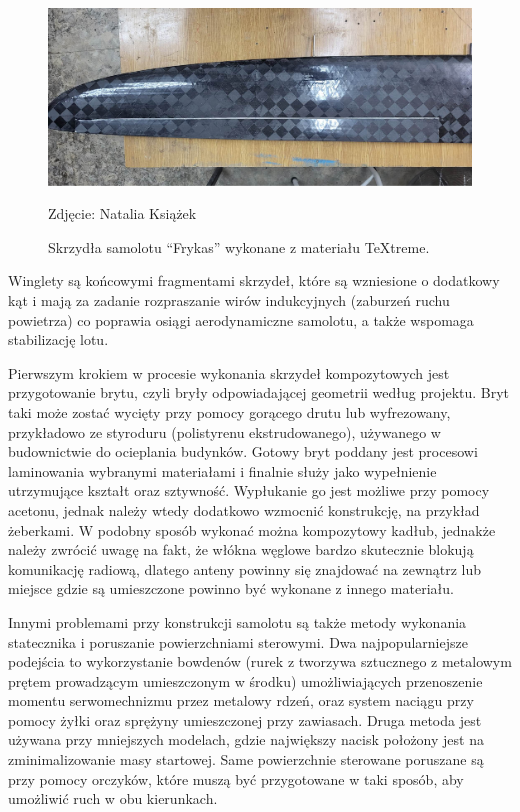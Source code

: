 \documentclass[12pt, a4paper]{article}
\begin{document}
 \begin{figure}[ht]
    \centering
    \includegraphics[width=1\textwidth]{frykas}
    \caption{Skrzydła samolotu ``Frykas'' wykonane z materiału TeXtreme.}
    \small Zdjęcie: Natalia Książek
    \label{fig:frykas}
\end{figure}


Winglety są końcowymi fragmentami skrzydeł, które są wzniesione o dodatkowy kąt i mają za zadanie rozpraszanie wirów indukcyjnych (zaburzeń ruchu powietrza) co poprawia osiągi aerodynamiczne samolotu, a także wspomaga stabilizację lotu.

Pierwszym krokiem w procesie wykonania skrzydeł kompozytowych jest przygotowanie brytu, czyli bryły odpowiadającej geometrii według projektu. Bryt taki może zostać wycięty przy pomocy gorącego drutu lub wyfrezowany, przykładowo ze styroduru (polistyrenu ekstrudowanego), używanego w budownictwie do ocieplania budynków. Gotowy bryt poddany jest procesowi laminowania wybranymi materiałami i finalnie służy jako wypełnienie utrzymujące kształt oraz sztywność. Wypłukanie go jest możliwe przy pomocy acetonu, jednak należy wtedy dodatkowo wzmocnić konstrukcję, na przykład żeberkami. W podobny sposób wykonać można kompozytowy kadłub, jednakże należy zwrócić uwagę na fakt, że włókna węglowe bardzo skutecznie blokują komunikację radiową, dlatego anteny powinny się znajdować na zewnątrz lub miejsce gdzie są umieszczone powinno być wykonane z innego materiału.

Innymi problemami przy konstrukcji samolotu są także metody wykonania statecznika i poruszanie powierzchniami sterowymi. Dwa najpopularniejsze podejścia to wykorzystanie bowdenów (rurek z tworzywa sztucznego z metalowym prętem prowadzącym umieszczonym w środku) umożliwiających przenoszenie momentu serwomechnizmu przez metalowy rdzeń, oraz system naciągu przy pomocy żyłki oraz sprężyny umieszczonej przy zawiasach. Druga metoda jest używana przy mniejszych modelach, gdzie największy nacisk położony jest na zminimalizowanie masy startowej. Same powierzchnie sterowane poruszane są przy pomocy orczyków, które muszą być przygotowane w taki sposób, aby umożliwić ruch w obu kierunkach.
\end{document}
